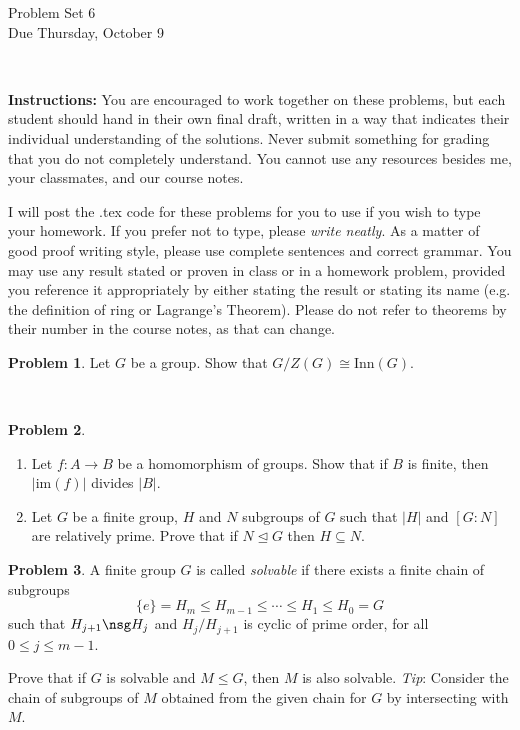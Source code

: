 \documentclass[11pt]{article}
\title{}
\date{\vspace{-0.5in}}
\theoremstyle{definition}
\newtheorem{problem}{Problem}
\begin{document}
\thispagestyle{fancy}
\pagestyle{fancy}

\vspace{3em}

\begin{center}
	{\LARGE Problem Set 6 \\}
	Due Thursday, October 9
\end{center}

\

\noindent
{\bf Instructions:}
You are encouraged to work together on these problems, but each student should hand in their own final draft, written in a way that indicates their individual understanding of the solutions. Never submit something for grading that you do not completely understand. You cannot use any resources besides me, your classmates, and our course notes.


I will post the .tex code for these problems for you to use if you wish to type your homework. If you prefer not to type, please  {\em write neatly}. As a matter of good proof writing style, please use complete sentences and correct grammar. You may use any result stated or proven in class or in a homework problem, provided you reference it appropriately by either stating the result or stating its name (e.g. the definition of ring or Lagrange's Theorem). Please do not refer to theorems by their number in the course notes, as that can change.


\smallskip

\begin{problem}
Let $G$ be a group. Show that $G/Z(G) \cong \mathrm{Inn}(G)$.
\end{problem}

\

\begin{problem} 
\begin{enumerate}[(2.1)]
\item Let $f:A \to B$ be a homomorphism of groups. Show that if $B$ is finite, then $|\mathrm{im}(f)|$ divides $|B|$.
\item  Let $G$ be a finite group, $H$ and $N$ subgroups of $G$ such that $|H|$ and $[G : N]$ are relatively prime. Prove that if $N \trianglelefteq G$ then $H \subseteq N$.
\end{enumerate}
\end{problem}



\begin{problem} A finite group $G$ is called {\em solvable} if there exists a finite chain of subgroups
  $$
  \{e\} = H_m \leq H_{m-1} \leq \cdots \leq H_1 \leq H_0 = G
  $$
  such that $H_{j+1} \nsg H_j$ and $H_j/H_{j+1}$ is cyclic of  prime order, for all $0 \leq j \leq m-1$. 

  Prove that if $G$ is solvable and $M \leq G$, then $M$ is also
  solvable. {\em Tip}: Consider the chain  of subgroups of $M$ obtained from the given chain for $G$ by
    intersecting with $M$.
    
    \end{problem}
\end{document}
